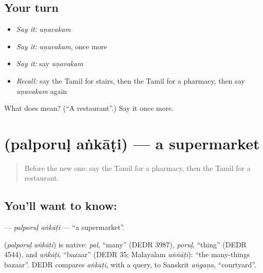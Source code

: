\subsection*{Your turn}
\begin{itemize}
\raggedright
  \item \emph{Say it:} \emph{uṇavakam}
  \item \emph{Say it:} \emph{uṇavakam}, once more
  \item \emph{Say it:} say \emph{uṇavakam}
  \item \emph{Recall:} say the Tamil for stairs, then the Tamil for a pharmacy, then say \emph{uṇavakam} again
\end{itemize}

\begin{tcolorbox}[breakable,colback=teal!4,colframe=teal!35!black,title={Before you move on}]
What does  mean? (\textquotedblleft{}A restaurant\textquotedblright{}.) Say it once more.
\end{tcolorbox}
\section[\texorpdfstring{\ta{பல்பொருள்} \ta{அங்காடி} (palporuḷ aṅkāṭi)}{பல்பொருள் அங்காடி (palporuḷ aṅkāṭi)}]{  (palporuḷ aṅkāṭi) — a supermarket}

\label{lesson:TA-C204-palporul-ankati}



\begin{quote}
Before the new one: say the Tamil for a pharmacy, then the Tamil for a restaurant.
\end{quote}

\subsection*{You'll want to know:  }
\textbf{ } — \emph{palporuḷ aṅkāṭi} — \textquotedblleft{}a supermarket\textquotedblright{}.

\begin{cousinweb}
\textbf{ } (\emph{palporuḷ aṅkāṭi}) is native: \emph{pal}, \textquotedblleft{}many\textquotedblright{} (DEDR 3987), \emph{poruḷ}, \textquotedblleft{}thing\textquotedblright{} (DEDR 4544), and \emph{aṅkāṭi}, \textquotedblleft{}bazaar\textquotedblright{} (DEDR 35; Malayalam \emph{aṅṅāṭi}): \textquotedblleft{}the many-things bazaar\textquotedblright{}. DEDR compares \emph{aṅkāṭi}, with a query, to Sanskrit \emph{aṅgaṇa}, \textquotedblleft{}courtyard\textquotedblright{}.
\end{cousinweb}

